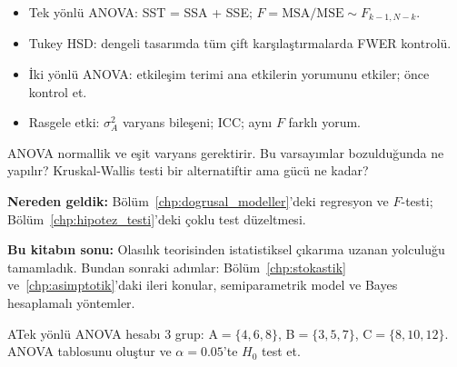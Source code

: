 
\begin{mikroozet}
\begin{itemize}
  \item Tek yönlü ANOVA: SST = SSA + SSE; $F = \mathrm{MSA}/\mathrm{MSE}\sim F_{k-1,N-k}$.
  \item Tukey HSD: dengeli tasarımda tüm çift karşılaştırmalarda FWER kontrolü.
  \item İki yönlü ANOVA: etkileşim terimi ana etkilerin yorumunu etkiler; önce kontrol et.
  \item Rasgele etki: $\sigma_A^2$ varyans bileşeni; ICC; aynı $F$ farklı yorum.
\end{itemize}
\end{mikroozet}

\begin{ozyansima}
ANOVA normallik ve eşit varyans gerektirir. Bu varsayımlar bozulduğunda ne yapılır? Kruskal-Wallis testi bir alternatiftir ama gücü ne kadar?
\end{ozyansima}

\begin{kopru}
\textbf{Nereden geldik:} Bölüm~\ref{chp:dogrusal_modeller}'deki regresyon ve $F$-testi; Bölüm~\ref{chp:hipotez_testi}'deki çoklu test düzeltmesi.

\textbf{Bu kitabın sonu:} Olasılık teorisinden istatistiksel çıkarıma uzanan yolculuğu tamamladık. Bundan sonraki adımlar: Bölüm~\ref{chp:stokastik} ve~\ref{chp:asimptotik}'daki ileri konular, semiparametrik model ve Bayes hesaplamalı yöntemler.
\end{kopru}


\cozumlualistirmalar

\begin{alistirma}[Al.16.1]{A}{Tek yönlü ANOVA hesabı}
3 grup: A$=\{4,6,8\}$, B$=\{3,5,7\}$, C$=\{8,10,12\}$. ANOVA tablosunu oluştur ve $\alpha=0.05$'te $H_0$ test et.
\end{alistirma}

